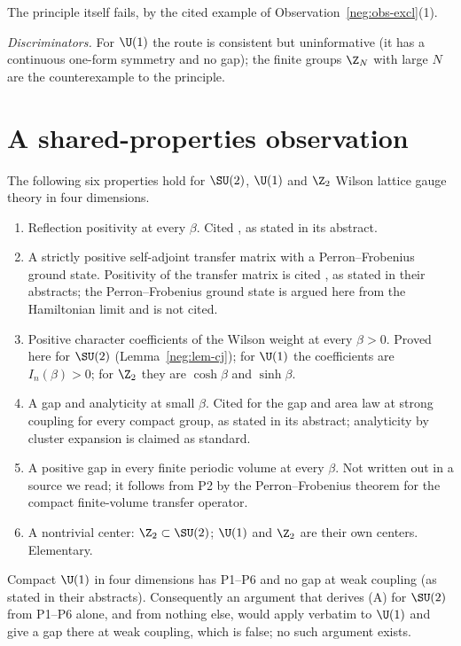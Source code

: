 The principle itself fails, by the cited example of Observation~\ref{neg:obs-excl}(1).

\emph{Discriminators.} For $\U(1)$ the route is consistent but uninformative (it has a continuous
one-form symmetry and no gap); the finite groups $\Z_N$ with large $N$ are the counterexample to
the principle.

\section{A shared-properties observation}\label{sec:shared}

\begin{observation}\label{neg:obs-shared}
The following six properties hold for $\SU(2)$, $\U(1)$ and $\Z_2$ Wilson lattice gauge theory
in four dimensions.
\begin{enumerate}
\item[P1] Reflection positivity at every $\beta$. Cited \cite{OS78}, as stated in its abstract.
\item[P2] A strictly positive self-adjoint transfer matrix with a Perron--Frobenius ground
state. Positivity of the transfer matrix is cited \cite{OS78,Lu77}, as stated in their
abstracts; the Perron--Frobenius ground state is argued here from the Hamiltonian limit
and is not cited.
\item[P3] Positive character coefficients of the Wilson weight at every $\beta>0$. Proved here
for $\SU(2)$ (Lemma~\ref{neg:lem-cj}); for $\U(1)$ the coefficients are $I_n(\beta)>0$; for
$\Z_2$ they are $\cosh\beta$ and $\sinh\beta$.
\item[P4] A gap and analyticity at small $\beta$. Cited \cite{OS78} for the gap and area law at
strong coupling for every compact group, as stated in its abstract; analyticity by cluster
expansion is claimed as standard.
\item[P5] A positive gap in every finite periodic volume at every $\beta$. Not written out in a source we read; it follows from P2 by the Perron--Frobenius theorem for the
compact finite-volume transfer operator.
\item[P6] A nontrivial center: $\Z_2\subset\SU(2)$; $\U(1)$ and $\Z_2$ are their own centers.
Elementary.
\end{enumerate}
Compact $\U(1)$ in four dimensions has P1--P6 and no gap at weak coupling \cite{Guth80,FS82}
(as stated in their abstracts). Consequently an argument that derives (A) for $\SU(2)$ from
P1--P6 alone, and from nothing else, would apply verbatim to $\U(1)$ and give a gap there at weak
coupling, which is false; no such argument exists.
\end{observation}

